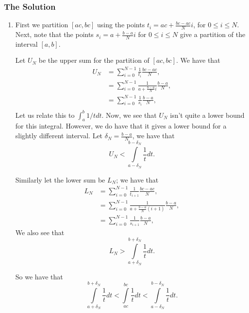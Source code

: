 \subsubsection*{The Solution}

\begin{enumerate}
\item First we partition \([ac, bc]\) using the points \(t_i = ac + \frac{bc - ac}{N} i \), for \(0 \leq i \leq N\).
Next, note that the points \(s_i = a + \frac{b - a}{N} i\) for \(0 \leq i \leq N\) give a partition of
the interval \([a, b]\).

Let \(U_N\) be the upper sum for the partition of \([ac, bc]\). We have that
\begin{align}
U_N & = \sum\limits_{i = 0}^{N-1} \frac{1}{t_i} \frac{bc - ac}{N}, \\
    & = \sum\limits_{i = 0}^{N - 1} \frac{1}{a + \frac{b - a}{N}i} \frac{b - a}{N}, \\
    & = \sum\limits_{i = 0}^{N - 1} \frac{1}{s_i} \frac{b - a}{N}, \\
\end{align}
Let us relate this to \(\int_a^b 1/t dt\). Now, we see that \(U_N\) isn't quite a lower bound for this integral.
However, we do have that it gives a lower bound for a slightly different interval. Let 
\(\delta_N = \frac{b - a}{N}\), we have that
\begin{equation}
U_N < \int\limits_{a - \delta_N}^{b - \delta_N} \frac{1}{t} dt.
\end{equation}

Similarly let the lower sum be \(L_N\); we have that 
\begin{align}
L_N & = \sum\limits_{i = 0}^{N-1} \frac{1}{t_{i+1}} \frac{bc - ac}{N}, \\ 
    & = \sum\limits_{i = 0}^{N - 1} \frac{1}{a + \frac{b - a}{N}(i+1)} \frac{b - a}{N}, \\
    & = \sum\limits_{i = 0}^{N - 1} \frac{1}{s_{i + 1}} \frac{b - a}{N}, 
\end{align}
We also see that
\begin{equation}
L_N > \int\limits_{a + \delta_N}^{b + \delta_N} \frac{1}{t} dt.
\end{equation}

So we have that
\begin{equation}
\int\limits_{a + \delta_N}^{b + \delta_N} \frac{1}{t} dt < \int\limits_{ac}^{bc} \frac{1}{t} dt
<  \int\limits_{a - \delta_N}^{b - \delta_N} \frac{1}{t} dt.
\end{equation}


\end{enumerate}
